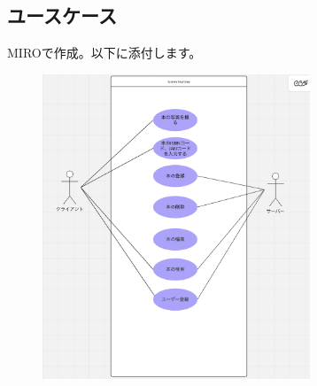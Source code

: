 \documentclass[a4paper, 11pt, titlepage]{jsarticle}
\begin{document}
\subsection{ユースケース}
MIROで作成。以下に添付します。
\begin{figure}[htbp]
\centering
\includegraphics[width=80mm]{usecase.png}
\label{fig:func}
\end{figure}
\end{document}

